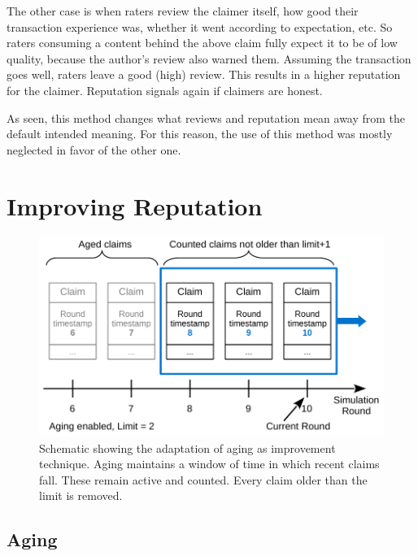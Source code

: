 \documentclass[%
    ]{\PathToTumTemplate/thesis/tum_thesis}
\begin{document}
The other case is when raters review the claimer itself, how good their transaction experience was, whether it went according to expectation, etc.
So raters consuming a content behind the above claim fully expect it to be of low quality, because the author's review also warned them.
Assuming the transaction goes well, raters leave a good (high) review.
This results in a higher reputation for the claimer.
Reputation signals again if claimers are honest.

As seen, this method changes what reviews and reputation mean away from the default intended meaning.
For this reason, the use of this method was mostly neglected in favor of the other one.



\section{Improving Reputation}\label{sec:approach_improvements}



\begin{figure}[tbp]
  \begin{center}
        \includegraphics[width=0.85\linewidth]	{../images/improvement_aging-crop.pdf}
    \caption{
    Schematic showing the adaptation of aging as improvement technique.
    Aging maintains a window of time in which recent claims fall.
    These remain active and counted.
    Every claim older than the limit is removed.
    }
    \label{fig:improvement_aging}
  \end{center}
\end{figure}

\subsection{Aging}
\end{document}
